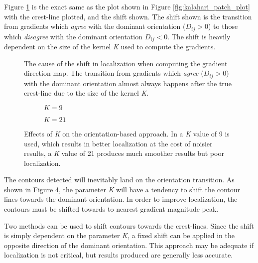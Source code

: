 Figure \ref{fig:orientation_transition_shift} is the exact same as the plot shown in Figure \ref{fig:kalahari_patch_plot} with the crest-line plotted, and the shift shown. The shift shown is the transition from gradients which \emph{agree} with the dominant orientation ($D_{ij} > 0$) to those which \emph{disagree} with the dominant orientation {$D_{ij} < 0$}. The shift is heavily dependent on the size of the kernel \emph{K} used to compute the gradients.

\begin{figure}
	\centering
	\caption{The cause of the shift in localization when computing the gradient direction map. The transition from gradients which \emph{agree} ($D_{ij} > 0$) with the dominant orientation almost always happens after the true crest-line due to the size of the kernel \emph{K}.}
	\label{fig:orientation_transition_shift}
\end{figure}

\begin{figure}
	\centering
	\begin{subfigure}{0.48\textwidth}
		\centering
		\caption{$K=9$}
		\label{fig:shift_k_9}
	\end{subfigure}
	\begin{subfigure}{0.48\textwidth}
		\centering
		\caption{$K=21$}
		\label{fig:shift_k_21}
	\end{subfigure}
	\caption{Effects of \emph{K} on the orientation-based approach. In  a \emph{K} value of 9 is used, which results in better localization at the cost of noisier results,  a \emph{K} value of 21 produces much smoother results but poor localization. }
	\label{fig:effect_k}
\end{figure}

The contours detected will inevitably land on the orientation transition. As shown in Figure \ref{fig:effect_k}, the parameter \emph{K} will have a tendency to shift the contour lines towards the dominant orientation. In order to improve localization, the contours must be shifted towards to nearest gradient magnitude peak. 

Two methods can be used to shift contours towards the crest-lines. Since the shift is simply dependent on the parameter \emph{K}, a fixed shift can be applied in the opposite direction of the dominant orientation. This approach may be adequate if localization is not critical, but results produced are generally less accurate.

